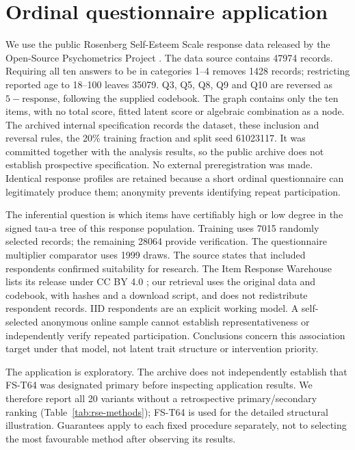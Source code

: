 \documentclass[11pt]{article}
\theoremstyle{plain}
\theoremstyle{definition}\newtheorem{remark}{Remark}\newtheorem{example}{Example}
\begin{document}
\section{Ordinal questionnaire application}\label{sec:rse}
We use the public Rosenberg Self-Esteem Scale response data released by the Open-Source Psychometrics Project \citep{rosenberg1965,rse2014}. The data source contains 47974 records. Requiring all ten answers to be in categories 1--4 removes 1428 records; restricting reported age to 18--100 leaves 35079. Q3, Q5, Q8, Q9 and Q10 are reversed as $5-\text{response}$, following the supplied codebook. The graph contains only the ten items, with no total score, fitted latent score or algebraic combination as a node. The archived internal specification records the dataset, these inclusion and reversal rules, the 20\% training fraction and split seed 61023117. It was committed together with the analysis results, so the public archive does not establish prospective specification. No external preregistration was made. Identical response profiles are retained because a short ordinal questionnaire can legitimately produce them; anonymity prevents identifying repeat participation.

The inferential question is which items have certifiably high or low degree in the signed tau-a tree of this response population. Training uses 7015 randomly selected records; the remaining 28064 provide verification. The questionnaire multiplier comparator uses 1999 draws. The source states that included respondents confirmed suitability for research. The Item Response Warehouse lists its release under CC BY 4.0 \citep{irw2026}; our retrieval uses the original data and codebook, with hashes and a download script, and does not redistribute respondent records. IID respondents are an explicit working model. A self-selected anonymous online sample cannot establish representativeness or independently verify repeated participation. Conclusions concern this association target under that model, not latent trait structure or intervention priority.

The application is exploratory. The archive does not independently establish that FS-T64 was designated primary before inspecting application results. We therefore report all 20 variants without a retrospective primary/secondary ranking (Table~\ref{tab:rse-methods}); FS-T64 is used for the detailed structural illustration. Guarantees apply to each fixed procedure separately, not to selecting the most favourable method after observing its results.
\end{document}
